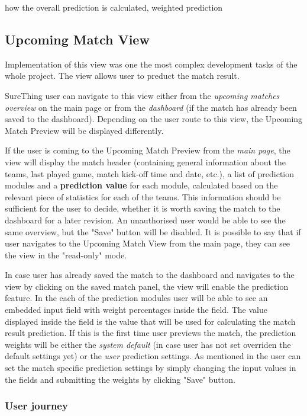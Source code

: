 how the overall prediction is calculated, weighted prediction

\subsection{Upcoming Match View}
\label{subsec:implementupcomingmatchview}
Implementation of this view was one the most complex development tasks of the whole project. The view allows user to preduct the match result.

SureThing user can navigate to this view either from the \emph{upcoming matches overview} on the main page or from the \emph{dashboard} (if the match has already been saved to the dashboard). Depending on the user route to this view, the Upcoming Match Preview will be displayed differently.

If the user is coming to the Upcoming Match Preview from the \emph{main page}, the view will display the match header (containing general information about the teams, last played game, match kick-off time and date, etc.), a list of prediction modules and a \textbf{prediction value} for each module, calculated based on the relevant piece of statistics for each of the teams. This information should be sufficient for the user to decide, whether it is worth saving the match to the dashboard for a later revision. An unauthorised user would be able to see the same overview, but the "Save" button will be disabled. It is possible to say that if user navigates to the Upcoming Match View from the main page, they can see the view in the "read-only" mode. 

In case user has already saved the match to the dashboard and navigates to the view by clicking on the saved match panel, the view will enable the prediction feature. In the each of the prediction modules user will be able to see an embedded input field with weight percentages inside the field. The value displayed inside the field is the value that will be used for calculating the match result prediction. If this is the first time user previews the match, the prediction weights will be either the \emph{system default} (in case user has not set overriden the default settings yet) or the \emph{user} prediction settings. As mentioned in the \cite{subsec:predictionimplementation}user can set the match specific prediction settings by simply changing the input values in the fields and submitting the weights by clicking "Save" button.

\subsubsection{User journey}
\label{subsec:upcomingmatchviewuserjourney}


